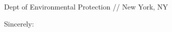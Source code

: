 \documentclass[
    jphafner,
    fontsize=11pt,
    foldmarks=false,
    pagenumber=false,
    addrfield=true,
]{scrlttr2}
\begin{document}
\begin{letter}{Dept of Environmental Protection // New  York, NY}







\closing{Sincerely:}
\end{letter}
\end{document}
